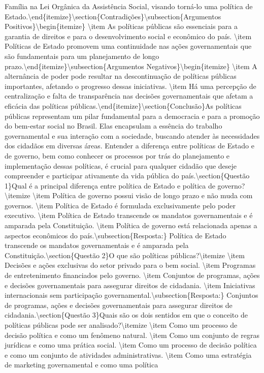 \documentclass[
   article,       
   12pt,          
   oneside,       
   a4paper,       
   english,       
   brazil,        
   sumario=tradicional
   ]{abntex2}
\begin{document}
Família na Lei Orgânica da Assistência Social, visando torná-lo uma política de Estado.\textbackslash{}end\{itemize\}\textbackslash{}section\{Contradições\}\textbackslash{}subsection\{Argumentos Positivos\}\textbackslash{}begin\{itemize\}    \textbackslash{}item As políticas públicas são essenciais para a garantia de direitos e para o desenvolvimento social e econômico do país.    \textbackslash{}item Políticas de Estado promovem uma continuidade nas ações governamentais que são fundamentais para um planejamento de longo prazo.\textbackslash{}end\{itemize\}\textbackslash{}subsection\{Argumentos Negativos\}\textbackslash{}begin\{itemize\}    \textbackslash{}item A alternância de poder pode resultar na descontinuação de políticas públicas importantes, afetando o progresso dessas iniciativas.    \textbackslash{}item Há uma percepção de centralização e falta de transparência nas decisões governamentais que afetam a eficácia das políticas públicas.\textbackslash{}end\{itemize\}\textbackslash{}section\{Conclusão\}As políticas públicas representam um pilar fundamental para a democracia e para a promoção do bem-estar social no Brasil. Elas encapsulam a essência do trabalho governamental e sua interação com a sociedade, buscando atender às necessidades dos cidadãos em diversas áreas. Entender a diferença entre políticas de Estado e de governo, bem como conhecer os processos por trás do planejamento e implementação dessas políticas, é crucial para qualquer cidadão que deseje compreender e participar ativamente da vida pública do país.\textbackslash{}section\{Questão 1\}Qual é a principal diferença entre política de Estado e política de governo?\textbackslash{}itemize    \textbackslash{}item Política de governo possui visão de longo prazo e não muda com governos.    \textbackslash{}item Política de Estado é formulada exclusivamente pelo poder executivo.    \textbackslash{}item Política de Estado transcende os mandatos governamentais e é amparada pela Constituição.    \textbackslash{}item Política de governo está relacionada apenas a aspectos econômicos do país.\textbackslash{}subsection\{Resposta:\} Política de Estado transcende os mandatos governamentais e é amparada pela Constituição.\textbackslash{}section\{Questão 2\}O que são políticas públicas?\textbackslash{}itemize    \textbackslash{}item Decisões e ações exclusivas do setor privado para o bem social.    \textbackslash{}item Programas de entretenimento financiados pelo governo.    \textbackslash{}item Conjuntos de programas, ações e decisões governamentais para assegurar direitos de cidadania.    \textbackslash{}item Iniciativas internacionais sem participação governamental.\textbackslash{}subsection\{Resposta:\} Conjuntos de programas, ações e decisões governamentais para assegurar direitos de cidadania.\textbackslash{}section\{Questão 3\}Quais são os dois sentidos em que o conceito de políticas públicas pode ser analisado?\textbackslash{}itemize    \textbackslash{}item Como um processo de decisão política e como um fenômeno natural.    \textbackslash{}item Como um conjunto de regras jurídicas e como uma prática social.    \textbackslash{}item Como um processo de decisão política e como um conjunto de atividades administrativas.    \textbackslash{}item Como uma estratégia de marketing governamental e como uma política 
\end{document}
